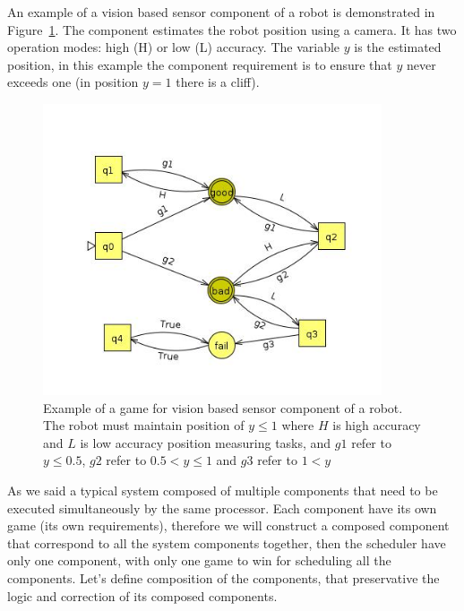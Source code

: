 \documentclass[ twoside, 12pt ]{article}
\begin{document}
An example of a vision based sensor component of a robot is demonstrated in Figure~\ref{fig:exampleGame}. 
The component estimates the robot position using a camera. It has two operation modes: high (H) or low (L) accuracy.
The variable $y$ is the estimated position, in this example the component requirement is to ensure that $y$ never exceeds one (in position $y=1$ there is a cliff). 

\begin{figure} [h]
    \centerline{\includegraphics[width=100mm]{gameExample.jpg}}
    \caption{Example of a game for vision based sensor component of a robot.
        The robot must maintain position of $y \le 1$ where $H$ is high accuracy and $L$ is low accuracy position measuring tasks, and
        $g1$ refer to $y \le 0.5$, $g2$ refer to $0.5 < y \le 1$ and $g3$ refer to $1 < y$ }
    \label{fig:exampleGame}
\end{figure}

As we said a typical system composed of multiple components that need to be executed simultaneously by the same processor.
Each component have its own game (its own requirements), therefore we will construct a composed component that correspond to all the system components together, then the scheduler have only one component, with only one game to win for scheduling all the components.
Let's define composition of the components, that preservative the logic and correction of its composed components.
\end{document}
